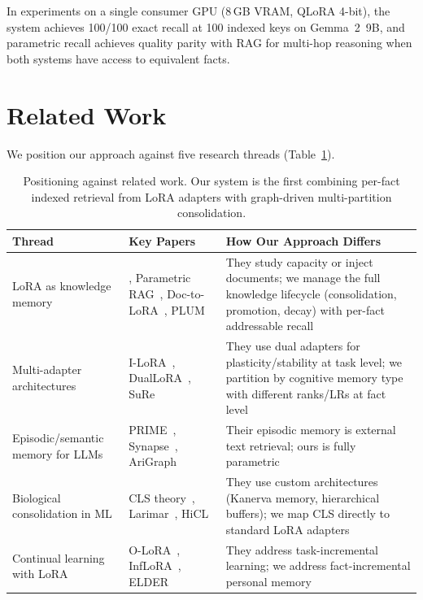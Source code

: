 \documentclass[11pt]{article}
\begin{document}
In experiments on a single consumer GPU (8\,GB VRAM, QLoRA 4-bit), the system achieves 100/100 exact recall at 100 indexed keys on Gemma~2~9B, and parametric recall achieves quality parity with RAG for multi-hop reasoning when both systems have access to equivalent facts.

\section{Related Work}
\label{sec:related}

We position our approach against five research threads (Table~\ref{tab:related}).

\begin{table}[t]
\centering
\caption{Positioning against related work. Our system is the first combining per-fact indexed retrieval from LoRA adapters with graph-driven multi-partition consolidation.}
\label{tab:related}
\small
\begin{tabular}{@{}p{2.8cm}p{3.8cm}p{4.8cm}@{}}
\toprule
\textbf{Thread} & \textbf{Key Papers} & \textbf{How Our Approach Differs} \\
\midrule
LoRA as knowledge memory &
\citet{back2026understanding}, Parametric RAG~\citep{su2025prag}, Doc-to-LoRA~\citep{charakorn2026doctolora}, PLUM~\citep{magister2024plum} &
They study capacity or inject documents; we manage the full knowledge lifecycle (consolidation, promotion, decay) with per-fact addressable recall \\
\addlinespace
Multi-adapter architectures &
I-LoRA~\citep{yang2024ilora}, DualLoRA~\citep{wang2024duallora}, SuRe~\citep{kim2025sure} &
They use dual adapters for plasticity/stability at task level; we partition by cognitive memory type with different ranks/LRs at fact level \\
\addlinespace
Episodic/semantic memory for LLMs &
PRIME~\citep{zhang2025prime}, Synapse~\citep{yuan2026synapse}, AriGraph~\citep{anokhin2025arigraph} &
Their episodic memory is external text retrieval; ours is fully parametric \\
\addlinespace
Biological consolidation in ML &
CLS theory~\citep{mcclelland1995complementary}, Larimar~\citep{das2024larimar}, HiCL~\citep{schug2025hicl} &
They use custom architectures (Kanerva memory, hierarchical buffers); we map CLS directly to standard LoRA adapters \\
\addlinespace
Continual learning with LoRA &
O-LoRA~\citep{wang2023olora}, InfLoRA~\citep{liang2024inflora}, ELDER~\citep{xia2025elder} &
They address task-incremental learning; we address fact-incremental personal memory \\
\bottomrule
\end{tabular}
\end{table}
\end{document}
